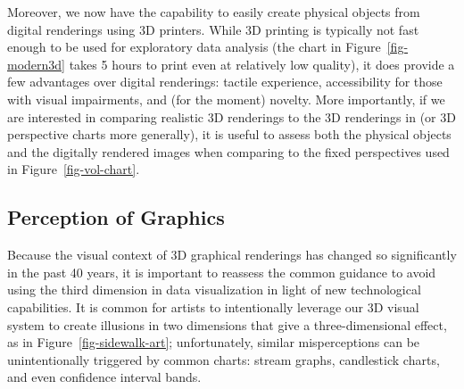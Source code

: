 \documentclass[runningheads
]{llncs}
\begin{document}
Moreover, we now have the capability to easily create physical objects
from digital renderings using 3D printers. While 3D printing is
typically not fast enough to be used for exploratory data analysis (the
chart in Figure~\ref{fig-modern3d} takes 5 hours to print even at
relatively low quality), it does provide a few advantages over digital
renderings: tactile experience, accessibility for those with visual
impairments, and (for the moment) novelty. More importantly, if we are
interested in comparing realistic 3D renderings to the 3D renderings in
\textcite{clevelandGraphicalPerceptionTheory1984} (or 3D perspective
charts more generally), it is useful to assess both the physical objects
and the digitally rendered images when comparing to the fixed
perspectives used in Figure~\ref{fig-vol-chart}.

\subsection{Perception of Graphics}\label{perception-of-graphics}

Because the visual context of 3D graphical renderings has changed so
significantly in the past 40 years, it is important to reassess the
common guidance to avoid using the third dimension in data visualization
in light of new technological capabilities. It is common for artists to
intentionally leverage our 3D visual system to create illusions in two
dimensions that give a three-dimensional effect, as in
Figure~\ref{fig-sidewalk-art}; unfortunately, similar misperceptions can
be unintentionally triggered by common charts: stream graphs,
candlestick charts, and even confidence interval bands.
\end{document}
